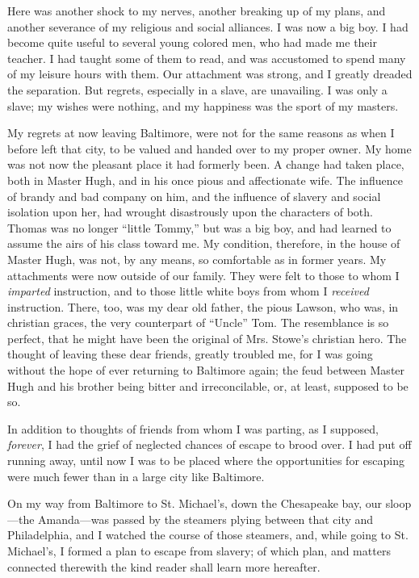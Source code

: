 Here was another shock to my nerves, another breaking up of my plans,
and another severance of my religious and social alliances. I was now a
big boy. I had become quite useful to several young colored men, who had
made me their teacher. I had taught some of them to read, and was
accustomed to spend many of my leisure hours with them. Our {}attachment
was strong, and I greatly dreaded the separation. But regrets,
especially in a slave, are unavailing. I was only a slave; my wishes
were nothing, and my happiness was the sport of my masters.

My regrets at now leaving Baltimore, were not for the same reasons as
when I before left that city, to be valued and handed over to my proper
owner. My home was not now the pleasant place it had formerly been. A
change had taken place, both in Master Hugh, and in his once pious and
affectionate wife. The influence of brandy and bad company on him, and
the influence of slavery and social isolation upon her, had wrought
disastrously upon the characters of both. Thomas was no longer ``little
Tommy,'' but was a big boy, and had learned to assume the airs of his
class toward me. My condition, therefore, in the house of Master Hugh,
was not, by any means, so comfortable as in former years. My attachments
were now outside of our family. They were felt to those to whom I
\emph{imparted} instruction, and to those little white boys from whom I
\emph{received} instruction. There, too, was my dear old father, the
pious Lawson, who was, in christian graces, the very counterpart of
``Uncle'' Tom. The resemblance is so perfect, that he might have been
the original of Mrs. Stowe's christian hero. The thought of leaving
these dear friends, greatly troubled me, for I was going without the
hope of ever returning to Baltimore again; the feud between Master Hugh
and his brother being bitter and irreconcilable, or, at least, supposed
to be so.

In addition to thoughts of friends from whom I was parting, as I
supposed, \emph{forever}, I had the grief of {}neglected chances of
escape to brood over. I had put off running away, until now I was to be
placed where the opportunities for escaping were much fewer than in a
large city like Baltimore.

On my way from Baltimore to St. Michael's, down the Chesapeake bay, our
sloop---the Amanda---was passed by the steamers plying between that city
and Philadelphia, and I watched the course of those steamers, and, while
going to St. Michael's, I formed a plan to escape from slavery; of which
plan, and matters connected therewith the kind reader shall learn more
hereafter.

~
